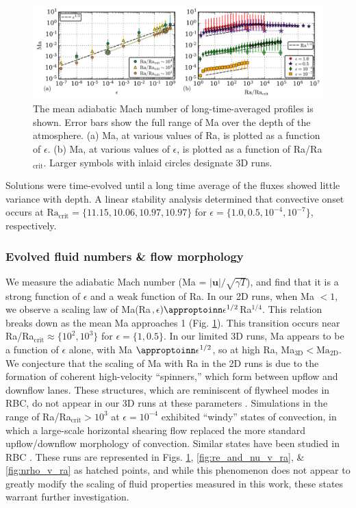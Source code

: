\begin{figure}[t]
\includegraphics[width=\textwidth]{./figs/ma_v_Ra.pdf}
\caption{The mean adiabatic Mach number of long-time-averaged profiles
is shown.  Error bars show the full range of Ma over the depth of the
atmosphere.
(a) Ma, at various values of Ra, 
is plotted as a function of $\epsilon$.
(b) Ma, at various values of $\epsilon$, 
is plotted as a function of Ra/Ra$_{\text{crit}}$.
Larger symbols with inlaid circles designate 3D runs.
\label{fig:ma_v_eps} }
\end{figure}


Solutions were time-evolved until a long time average of the fluxes
showed little
variance with depth. A linear stability analysis determined
that convective onset
occurs at $\text{Ra}_{\text{crit}} = \{11.15, 10.06, 10.97, 10.97\}$ 
for $\epsilon = \{1.0, 0.5, 10^{-4}, 10^{-7}\}$, respectively.  


\vspace{-0.5cm}
\subsubsection{Evolved fluid numbers \& flow morphology}

We measure the adiabatic Mach number (Ma = $|\bm{u}|/\sqrt{\gamma T}$),
and find that it is a strong function of 
$\epsilon$ and a weak function of Ra.  
In our 2D runs, when Ma $< 1$, we observe a scaling law of
Ma(Ra$, \epsilon) \appropto \epsilon^{1/2}$Ra$^{1/4}$.
This relation breaks down as the mean
Ma approaches 1 (Fig. \ref{fig:ma_v_eps}).  This transition
occurs near Ra/Ra$_\text{crit} \approx \{10^{2}, 10^{3}\}$ for $\epsilon = \{1, 0.5\}$.
In our limited 3D runs, Ma appears to be a function of $\epsilon$ alone, with
Ma $\appropto \epsilon^{1/2}$, so at high Ra, Ma$_{\text{3D}} < \text{Ma}_{\text{2D}}$.
We conjecture that the scaling of Ma with Ra in the 2D runs 
is due to the formation of coherent high-velocity ``spinners,'' which form
between upflow and downflow lanes.  These structures, which are reminiscent of flywheel
modes in RBC, do not appear in our 3D runs at these parameters
\cite{jones&all1976, brummell&all2002}.
Simulations in the range of Ra/Ra$_{\text{crit}} > 10^3$ at $\epsilon = 10^{-4}$
exhibited ``windy'' states of convection, in which a large-scale horizontal
shearing flow replaced the more standard upflow/downflow morphology of
convection.  Similar states have been studied in
RBC \cite{goluskin&all2014}.  These runs are represented in Figs. 
\ref{fig:ma_v_eps}, \ref{fig:re_and_nu_v_ra}, \& \ref{fig:nrho_v_ra}
as hatched points, and while this phenomenon does not appear to greatly modify the
scaling of fluid properties measured in this work, these states warrant
further investigation.



